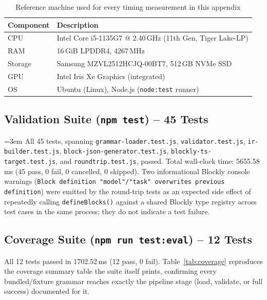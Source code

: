 \documentclass[runningheads]{llncs}
\begin{document}
{\begin{table}[h]
\centering
\caption{Reference machine used for every timing measurement in this appendix}
\label{tab:hw}
\begin{tabular}{l l}
\hline
Component & Description \\
\hline
CPU      & Intel Core i5-1135G7 @ 2.40\,GHz (11th Gen, Tiger Lake-LP) \\
RAM      & 16\,GiB LPDDR4, 4267\,MHz \\
Storage  & Samsung MZVL2512HCJQ-00BT7, 512\,GB NVMe SSD \\
GPU      & Intel Iris Xe Graphics (integrated) \\
OS       & Ubuntu (Linux), Node.js (\texttt{node:test} runner) \\
\hline
\end{tabular}
\end{table}

\subsection{Validation Suite (\texttt{npm test}) -- 45 Tests}
\label{sec:appendix-validation}

{\emergencystretch=3em
All 45 tests, spanning \texttt{grammar-loader.test.js}, \texttt{validator.test.js}, \texttt{ir-builder.test.js}, \texttt{block-json-generator.test.js}, \texttt{blockly-ts-target.test.js}, and \texttt{roundtrip.test.js}, passed. Total wall-clock time: 5655.58\,ms (45 pass, 0 fail, 0 cancelled, 0 skipped). Two informational Blockly console warnings (\texttt{Block definition "model"/"task" overwrites previous definition}) were emitted by the round-trip tests as an expected side effect of repeatedly calling \texttt{defineBlocks()} against a shared Blockly type registry across test cases in the same process; they do not indicate a test failure.
\par}

\subsection{Coverage Suite (\texttt{npm run test:eval}) -- 12 Tests}
\label{sec:appendix-coverage}

All 12 tests passed in 1702.52\,ms (12 pass, 0 fail). Table~\ref{tab:coverage} reproduces the coverage summary table the suite itself prints, confirming every bundled/fixture grammar reaches exactly the pipeline stage (load, validate, or full success) documented for it.

}
\end{document}
